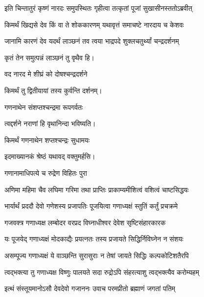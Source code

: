 \begin{center}
\twolineshloka
{इति चिन्तातुरं कृष्णं नारदः समुपस्थितः}
{गृहीत्वा तत्कृतां पूजां सुखासीनस्ततोऽब्रवीत्}%


\twolineshloka
{किमर्थं खिद्यसे देव किं वा ते शोककारणम्}
{यथावृत्तं समाचष्टे नारदाय च केशवः}%


\twolineshloka
{जानामि कारणं देव यदर्थं लाञ्छनं तव}
{त्वया भाद्रपदे शुक्लचतुर्थ्यां चन्द्रदर्शनम्}%

{कृतं तेन समुत्पन्नं लाञ्छनं तु वृथैव हि।}


\onelineshloka
{वद नारद मे शीघ्रं को दोषश्चन्द्रदर्शने}%

{किमर्थं तु द्वितीयायां तस्य कुर्वन्ति दर्शनम्।}


\onelineshloka
{गणनाथेन संशप्तश्चन्द्रमा रूपगर्वतः}%

{त्वद्दर्शने नराणां हि वृथानिन्दा भविष्यति।}

\onelineshloka
{किमर्थं गणनाथेन शप्तश्चन्द्रः सुधामयः}%

{इदमाख्यानकं श्रेष्ठं यथावद् वक्तुमर्हसि।} 

\onelineshloka
{गणानामाधिपत्ये च रुद्रेण विहितः पुरा}%

\twolineshloka
{अणिमा महिमा चैव लघिमा गरिमा तथा}
{प्राप्तिः प्राकाम्यमीशित्वं वशित्वं चाष्टसिद्धयः}%

\twolineshloka
{भार्यार्थं प्रददौ देवो गणेशस्य प्रजापतिः}
{पूजयित्वा गणाध्यक्षं स्तुतिं कर्तुं प्रचक्रमे}%


\twolineshloka
{गजवक्त्र गणाध्यक्ष लम्बोदर वरप्रद}
{विघ्नाधीश्वर देवेश सृष्टिसंहारकारक}%

\twolineshloka
{यः पूजयेद् गणाध्यक्षं मोदकाद्यैः प्रयत्नतः}
{तस्य प्रजायते सिद्धिर्निविघ्नेन न संशयः}%

\twolineshloka
{असम्पूज्य गणाध्यक्षं ये वाञ्छन्ति सुरासुराः}
{न तेषां जायते सिद्धिः कल्पकोटिशतैरपि}%

\twolineshloka
{त्वद्भक्त्या तु गणाध्यक्ष विष्णुः पालयते सदा}
{रुद्रोऽपि संहरत्याशु त्वद्भक्त्यैव करोम्यहम्}%

\twolineshloka
{इत्थं संस्तूयमानोऽसौ देवदेवो गजाननः}
{उवाच परमप्रीतो ब्रह्माणं जगतां पतिम्}%



\end{center}
